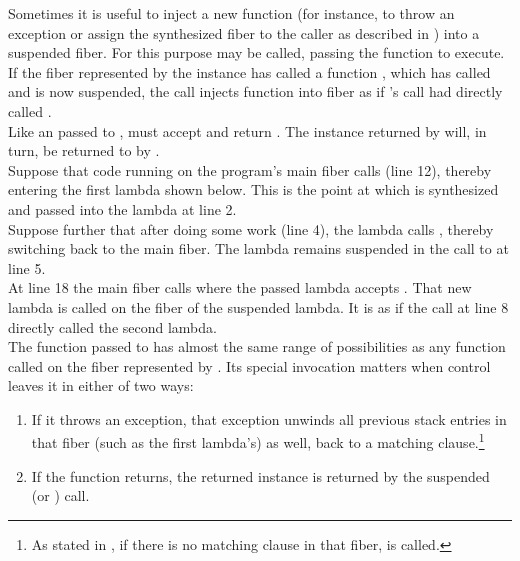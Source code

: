 \label{resumewith}
Sometimes it is useful to inject a new function (for instance, to throw an
exception or assign the synthesized fiber to the caller as described in
) into a suspended fiber. For this purpose
 may be called, passing the function  to
execute.\\
If the fiber represented by the \fiber instance  has called a function
, which has called \resume and is now suspended, the call 
 injects function  into fiber  as
if 's \resume call had directly called .\\

Like an \entryfn\xspace passed to \fiber,  must accept
 and return \fiber. The \fiber instance returned by 
will, in turn, be returned to  by \resume.\\

Suppose that code running on the program's main fiber calls \resume (line 12), thereby
entering the first lambda shown below. This is the point at which  is
synthesized and passed into the lambda at line 2.\\
Suppose further that after doing some work (line 4), the lambda calls
, thereby switching back to the main fiber. The lambda remains
suspended in the call to  at line 5.\\
At line 18 the main fiber calls  where the passed lambda
accepts . That new lambda is called on the fiber of the suspended
lambda. It is as if the  call at line 8 directly called the second
lambda.\\

The function passed to \resumewith has almost the same range of possibilities as
any function called on the fiber represented by . Its special invocation
matters when control leaves it in either of two ways:

\begin{enumerate}
  \item If it throws an exception, that exception unwinds all previous stack
        entries in that fiber (such as the first lambda's) as well, back to
        a matching  clause.\footnote{As stated
        in , if there is no matching 
        clause in that fiber,  is called.}
  \item If the function returns, the returned \fiber instance is returned by
        the suspended  (or \resumewith) call.
\end{enumerate}

